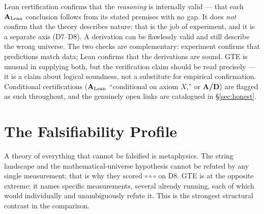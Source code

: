 \documentclass[11pt]{article}
\newcommand{\CatAL}{\ensuremath{\textbf{A}_{\rm Lean}}}
\newcommand{\CatAD}{\textbf{A/D}}
\newcommand{\rNone}{\ensuremath{\circ\circ\circ}}            %
\begin{document}
\begin{tcolorbox}[colback=yellow!8,colframe=yellow!60!black,
  title={What machine verification does \emph{not} establish}]
\small
Lean certification confirms that the \emph{reasoning} is internally valid --- that
each \CatAL{} conclusion follows from its stated premises with no gap.  It does
\emph{not} confirm that the theory describes nature: that is the job of experiment,
and it is a separate axis (D7--D8).  A derivation can be flawlessly valid and still
describe the wrong universe.  The two checks are complementary: experiment confirms
that predictions match data; Lean confirms that the derivations are sound.  GTE is
unusual in supplying both, but the verification claim should be read precisely ---
it is a claim about logical soundness, not a substitute for empirical confirmation.
Conditional certifications (\CatAL{} ``conditional on axiom $X$,'' or \CatAD)
are flagged as such throughout, and the genuinely open links are catalogued in
§\ref{sec:honest}.
\end{tcolorbox}

\section{The Falsifiability Profile}
\label{sec:falsify}

A theory of everything that cannot be falsified is metaphysics.  The string
landscape and the mathematical-universe hypothesis cannot be refuted by any single
measurement; that is why they scored \rNone{} on D8.  GTE is at the opposite
extreme: it names specific measurements, several already running, each of which
would individually and unambiguously refute it.  This is the strongest structural
contrast in the comparison.
\end{document}
